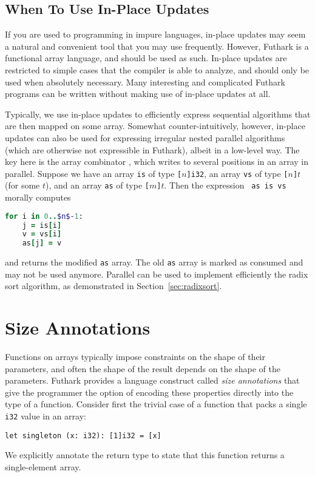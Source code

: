 \documentclass[oneside,11pt]{book}
\begin{document}
\subsection{When To Use In-Place Updates}

If you are used to programming in impure languages, in-place updates
may seem a natural and convenient tool that you may use frequently.
However, Futhark is a functional array language, and should be used as
such.  In-place updates are restricted to simple cases that the
compiler is able to analyze, and should only be used when absolutely
necessary.  Many interesting and complicated Futhark programs can be
written without making use of in-place updates at all.

Typically, we use in-place updates to efficiently express sequential
algorithms that are then mapped on some array.  Somewhat
counter-intuitively, however, in-place updates can also be used for
expressing irregular nested parallel algorithms (which are otherwise
not expressible in Futhark), albeit in a low-level way.  The key here
is the array combinator , which writes to several
positions in an array in parallel.  Suppose we have an array
\texttt{is} of type \texttt{[$n$]i32}, an array \texttt{vs} of type
\texttt{[$n$]$t$} (for some \texttt{$t$}), and an array \texttt{as} of
type \texttt{[$m$]$t$}. Then the expression \texttt{ as is vs}
morally computes

\begin{lstlisting}[language=ruby,mathescape=true]
  for i in 0..$n$-1:
    j = is[i]
    v = vs[i]
    as[j] = v
\end{lstlisting}

\noindent
and returns the modified \texttt{as} array.  The old \texttt{as} array
is marked as consumed and may not be used anymore.  Parallel
 can be used to implement efficiently the radix sort algorithm, as demonstrated in Section~\ref{sec:radixsort}.

\section{Size Annotations}
\label{sec:size-annotations}

Functions on arrays typically impose constraints on the shape of their
parameters, and often the shape of the result depends on the shape of
the parameters.  Futhark provides a language construct called
\textit{size annotations} that give the programmer the option of
encoding these properties directly into the type of a function.
Consider first the trivial case of a function that packs a single
\texttt{i32} value in an array:
\begin{lstlisting}
let singleton (x: i32): [1]i32 = [x]
\end{lstlisting}
We explicitly annotate the return type to state that this function
returns a single-element array.
\end{document}

